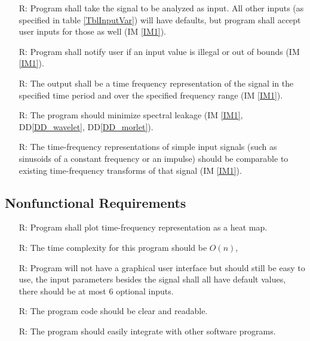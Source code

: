 \documentclass[12pt]{article}
\newcounter{reqnum} %
\begin{document}
\begin{itemize}

\item[R\refstepcounter{reqnum}\thereqnum \label{R_Inputs}:] Program shall take the signal to be analyzed as input. All other inputs (as specified in table \ref{TblInputVar}) will have defaults, but program shall accept user inputs for those as well (IM \ref{IM1}).

\item[R\refstepcounter{reqnum}\thereqnum \label{R_illegal_input}:] Program shall notify user if an input value is illegal or out of bounds (IM \ref{IM1}).
  
\item[R\refstepcounter{reqnum}\thereqnum \label{R_OutputInputs}:] The output shall be a time frequency representation of the signal in the specified time period and over the specified frequency range (IM \ref{IM1}).

\item[R\refstepcounter{reqnum}\thereqnum \label{R_spectral_leakage}:] The program should minimize spectral leakage (IM \ref{IM1}, DD\ref{DD_wavelet}, DD\ref{DD_morlet}). 

\item[R\refstepcounter{reqnum}\thereqnum \label{R_VerifyOutput}:] The time-frequency representations of simple input signals (such as sinusoids of a constant frequency or an impulse) should be comparable to existing time-frequency transforms of that signal (IM \ref{IM1}).

\end{itemize}

\subsection{Nonfunctional Requirements}

\begin{itemize}
\item[R\refstepcounter{reqnum}\thereqnum \label{R_heatmap}:] Program shall plot time-frequency representation as a heat map.
\item[R\refstepcounter{reqnum}\thereqnum \label{R_timecomplexity}:] The time complexity for this program should be $O(n)$,
\item[R\refstepcounter{reqnum}\thereqnum \label{R_useability}:] Program will not have a graphical user interface but should still be easy to use, the input parameters besides the signal shall all have default values, there should be at most 6 optional inputs.
\item[R\refstepcounter{reqnum}\thereqnum \label{R_readability}:] The program code should be clear and readable.
\item[R\refstepcounter{reqnum}\thereqnum \label{R_integration}:] The program should easily integrate with other software programs. 
\end{itemize}
\end{document}
